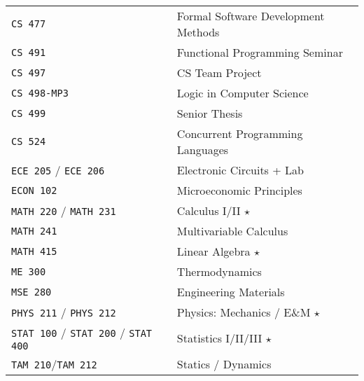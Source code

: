 \documentclass[10pt,letterpaper,sans]{moderncv}
\newcommand{\course}[2]{\texttt{#1 #2}}
\newcommand{\credit}[0]{$\star$}
\begin{document}
\begin{center}
\begin{tabular}{l p{1in} l}
  \course{CS}{477}     & \hfill & Formal Software Development Methods   \\
  \course{CS}{491}     & \hfill & Functional Programming Seminar        \\
  \course{CS}{497}     & \hfill & CS Team Project                       \\
  \course{CS}{498-MP3} & \hfill & Logic in Computer Science             \\
  \course{CS}{499}     & \hfill & Senior Thesis                         \\
  \course{CS}{524}     & \hfill & Concurrent Programming Languages      \\
  \hline
  \course{ECE}{205} / \course{ECE}{206}
                       & \hfill & Electronic Circuits + Lab             \\
  \hline
  \course{ECON}{102}   & \hfill & Microeconomic Principles              \\
  \hline
  \course{MATH}{220} / \course{MATH}{231}
                       & \hfill & Calculus I/II \credit{}               \\
  \course{MATH}{241}   & \hfill & Multivariable Calculus                \\
  \course{MATH}{415}   & \hfill & Linear Algebra \credit{}              \\
  \hline
  \course{ME}{300}     & \hfill & Thermodynamics                        \\
  \hline
  \course{MSE}{280}    & \hfill & Engineering Materials                 \\
  \hline
  \course{PHYS}{211} / \course{PHYS}{212}
                       & \hfill & Physics: Mechanics / E\&{}M \credit{} \\
  \hline
  \course{STAT}{100} / \course{STAT}{200} / \course{STAT}{400}
                       & \hfill & Statistics I/II/III \credit{}         \\
  \hline
  \course{TAM}{210}/\course{TAM}{212}
                       & \hfill & Statics / Dynamics                    \\
  \hline
\end{tabular}
\end{center}
\end{document}
